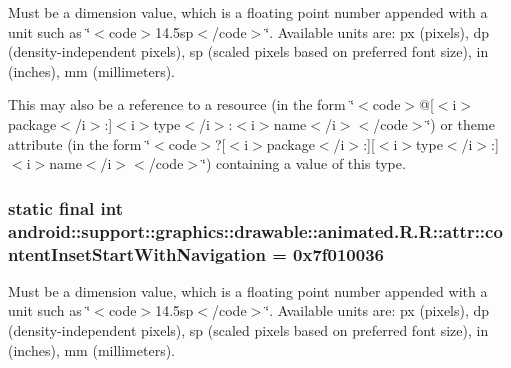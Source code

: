 Must be a dimension value, which is a floating point number appended with a unit such as \char`\"{}$<$code$>$14.5sp$<$/code$>$\char`\"{}. Available units are: px (pixels), dp (density-independent pixels), sp (scaled pixels based on preferred font size), in (inches), mm (millimeters). 

This may also be a reference to a resource (in the form \char`\"{}$<$code$>$@\mbox{[}$<$i$>$package$<$/i$>$:\mbox{]}$<$i$>$type$<$/i$>$:$<$i$>$name$<$/i$>$$<$/code$>$\char`\"{}) or theme attribute (in the form \char`\"{}$<$code$>$?\mbox{[}$<$i$>$package$<$/i$>$:\mbox{]}\mbox{[}$<$i$>$type$<$/i$>$:\mbox{]}$<$i$>$name$<$/i$>$$<$/code$>$\char`\"{}) containing a value of this type. \hypertarget{classandroid_1_1support_1_1graphics_1_1drawable_1_1animated_1_1_r_1_1attr_417f8a89ff1665bb20318a7408b0bc35}{
\subsubsection[{contentInsetStartWithNavigation}]{\setlength{\rightskip}{0pt plus 5cm}static final int android::support::graphics::drawable::animated.R.R::attr::contentInsetStartWithNavigation = 0x7f010036}}
\label{classandroid_1_1support_1_1graphics_1_1drawable_1_1animated_1_1_r_1_1attr_417f8a89ff1665bb20318a7408b0bc35}


Must be a dimension value, which is a floating point number appended with a unit such as \char`\"{}$<$code$>$14.5sp$<$/code$>$\char`\"{}. Available units are: px (pixels), dp (density-independent pixels), sp (scaled pixels based on preferred font size), in (inches), mm (millimeters). 

